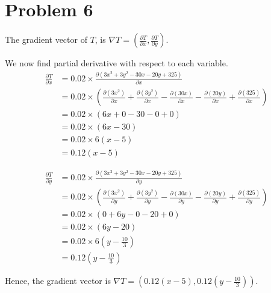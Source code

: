 \documentclass[12pt,a4paper]{article}
\begin{document}
\section*{Problem 6}
\begin{solution}
    The gradient vector of $T$, is
    $\nabla T = \left(\frac{\partial T}{\partial x}, \frac{\partial T}{\partial y}\right)$.

We now find partial derivative with respect to each variable.
\begin{align*}
    \frac{\partial T}{\partial x} &= 0.02 \times \frac{\partial \left(3x^{2} + 3y^{2} - 30x - 20y + 325\right)}{\partial x} \\
    &= 0.02 \times \left(\frac{\partial (3x^{2})}{\partial x} + \frac{\partial (3y^{2})}{\partial x} - \frac{\partial (30x)}{\partial x} - \frac{\partial (20y)}{\partial x} + \frac{\partial (325)}{\partial x}\right) \\
    &= 0.02 \times \left(6x + 0 - 30 - 0 + 0\right) \\
    &= 0.02 \times \left(6x - 30\right) \\
    &= 0.02 \times 6(x - 5) \\
    &= 0.12(x - 5)
\end{align*}

\begin{align*}
    \frac{\partial T}{\partial y} &= 0.02 \times \frac{\partial \left(3x^{2} + 3y^{2} - 30x - 20y + 325\right)}{\partial y} \\
    &= 0.02 \times \left(\frac{\partial (3x^{2})}{\partial y} + \frac{\partial (3y^{2})}{\partial y} - \frac{\partial (30x)}{\partial y} - \frac{\partial (20y)}{\partial y} + \frac{\partial (325)}{\partial y}\right) \\
    &= 0.02 \times \left(0 + 6y - 0 - 20 + 0\right) \\
    &= 0.02 \times \left(6y - 20\right) \\
    &= 0.02 \times 6(y - \frac{10}{3}) \\
    &= 0.12(y - \frac{10}{3})
\end{align*}

Hence, the gradient vector is $\nabla T = \left(0.12(x - 5), 0.12(y - \frac{10}{3})\right)$.
\end{solution}
\end{document}
